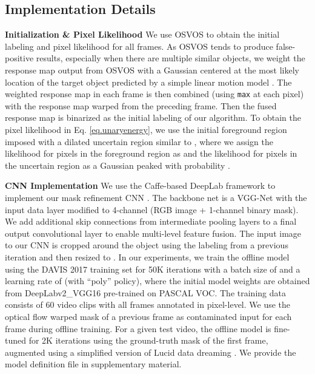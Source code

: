 \documentclass[10pt,twocolumn,letterpaper]{article}
\begin{document}
\subsection{Implementation Details}\label{sec.implementationdetails}

\noindent\textbf{Initialization \& Pixel Likelihood} We use OSVOS \cite{caelles2017one}
to obtain the initial labeling and pixel likelihood for all frames.
As OSVOS tends to produce false-positive results, especially when there are multiple similar objects,
we weight the response map output from OSVOS with a Gaussian centered at the most likely location of the target object
predicted by a simple linear motion model \cite{breitenstein2009robust,luo2014multiple}.
The weighted response map in each frame is then combined (using \texttt{max} at each pixel) with the response map warped from the preceding frame.
Then the fused response map is binarized as the initial labeling of our algorithm.
To obtain the pixel likelihood  in Eq. \eqref{eq.unaryenergy},
we use the initial foreground region imposed with a dilated uncertain region similar to \cite{voigtlaender2017online},
where we assign the likelihood for pixels in the foreground region as 
and the likelihood for pixels in the uncertain region as a Gaussian peaked with probability .



\noindent\textbf{CNN Implementation} We use the Caffe-based DeepLab framework \cite{chen2017deeplabpami} to implement our mask refinement CNN .
The backbone net is a VGG-Net \cite{Simonyan15vgg} with the input data layer modified to 4-channel (RGB image + 1-channel binary mask).
We add additional skip connections from intermediate pooling layers to a final output convolutional layer to enable multi-level feature fusion.
The input image to our CNN is cropped around the object using the labeling from a previous iteration
and then resized to . In our experiments, we train the offline model using the DAVIS 2017 training set \cite{PontTuset2017davischallenge}
for 50K iterations with a batch size of  and a learning rate of  (with ``poly'' policy),
where the initial model weights are obtained from DeepLabv2\_VGG16 pre-trained on PASCAL VOC.
The training data consists of 60 video clips with all frames annotated in pixel-level.
We use the optical flow warped mask of a previous frame as contaminated input for each frame during offline training.
For a given test video, the offline model is fine-tuned for 2K iterations using the ground-truth mask of the first frame,
augmented using a simplified version of Lucid data dreaming \cite{DAVIS2017-2nd}.
We provide the model definition file in supplementary material.
\end{document}
